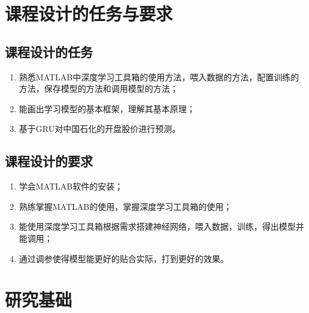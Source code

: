 \documentclass{jnuthesis}
\begin{document}
\renewcommand{\title}{A thesis class for Jinan University} %
\renewcommand{\biaoti}{基于GRU的股市预测}  %
\renewcommand{\xueyuan}{国际能源学院}
\renewcommand{\zhuanye}{电气工程及其自动化}
\renewcommand{\xingming}{余思贤、周允康}
\renewcommand{\xuehao}{2018054439}
\renewcommand{\daoshi}{庄师强}
\renewcommand{\zuzhang}{苏日清}
\renewcommand{\zuyuanone}{余思贤}
\renewcommand{\zuyuantwo}{梁宗威}
\renewcommand{\zuyuanthree}{谭铭濠}
\renewcommand{\zuyuanxhone}{2018054439}
\renewcommand{\zuyuanxhtwo}{2018054439}
\renewcommand{\zuyuanxhthree}{2018054439}
\renewcommand{\zuzhangxh}{2018054439}

\titlepage





\chapter{课程设计的任务与要求}
\section{课程设计的任务}

\begin{enumerate}
	\item 熟悉MATLAB中深度学习工具箱的使用方法，喂入数据的方法，配置训练的方法，保存模型的方法和调用模型的方法；
	\item 能画出学习模型的基本框架，理解其基本原理；
	\item 基于GRU对中国石化的开盘股价进行预测。
\end{enumerate}




\section{课程设计的要求}
\begin{enumerate}
	\item 学会MATLAB软件的安装；
	\item 熟练掌握MATLAB的使用，掌握深度学习工具箱的使用；
	\item 能使用深度学习工具箱根据需求搭建神经网络，喂入数据，训练，得出模型并能调用；
	\item 通过调参使得模型能更好的贴合实际，打到更好的效果。
\end{enumerate}

\chapter{研究基础}
\end{document}
